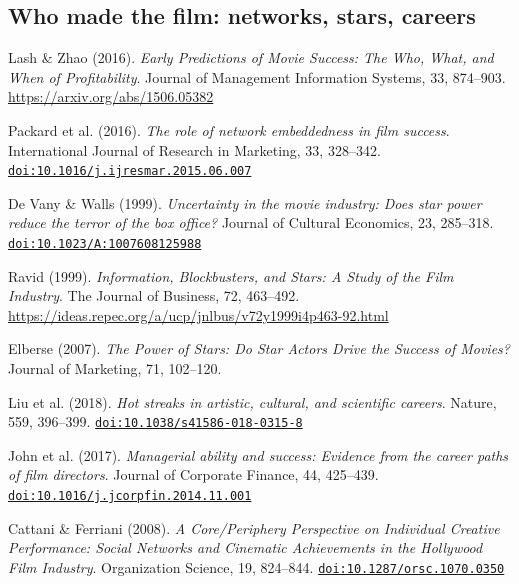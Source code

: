 \subsection{Who made the film: networks, stars, careers}
\begin{enumerate}[label={[\arabic*]},start=1,leftmargin=2.2em,itemsep=2pt]
\item Lash \& Zhao (2016). \textit{Early Predictions of Movie Success: The Who, What, and When of Profitability}. Journal of Management Information Systems, 33, 874--903. \url{https://arxiv.org/abs/1506.05382} 
\item Packard et al. (2016). \textit{The role of network embeddedness in film success}. International Journal of Research in Marketing, 33, 328--342. \href{https://doi.org/10.1016/j.ijresmar.2015.06.007}{\nolinkurl{doi:10.1016/j.ijresmar.2015.06.007}} 
\item De Vany \& Walls (1999). \textit{Uncertainty in the movie industry: Does star power reduce the terror of the box office?} Journal of Cultural Economics, 23, 285--318. \href{https://doi.org/10.1023/A:1007608125988}{\nolinkurl{doi:10.1023/A:1007608125988}} 
\item Ravid (1999). \textit{Information, Blockbusters, and Stars: A Study of the Film Industry}. The Journal of Business, 72, 463--492. \url{https://ideas.repec.org/a/ucp/jnlbus/v72y1999i4p463-92.html} 
\item Elberse (2007). \textit{The Power of Stars: Do Star Actors Drive the Success of Movies?} Journal of Marketing, 71, 102--120.  
\item Liu et al. (2018). \textit{Hot streaks in artistic, cultural, and scientific careers}. Nature, 559, 396--399. \href{https://doi.org/10.1038/s41586-018-0315-8}{\nolinkurl{doi:10.1038/s41586-018-0315-8}} 
\item John et al. (2017). \textit{Managerial ability and success: Evidence from the career paths of film directors}. Journal of Corporate Finance, 44, 425--439. \href{https://doi.org/10.1016/j.jcorpfin.2014.11.001}{\nolinkurl{doi:10.1016/j.jcorpfin.2014.11.001}} 
\item Cattani \& Ferriani (2008). \textit{A Core/Periphery Perspective on Individual Creative Performance: Social Networks and Cinematic Achievements in the {Hollywood} Film Industry}. Organization Science, 19, 824--844. \href{https://doi.org/10.1287/orsc.1070.0350}{\nolinkurl{doi:10.1287/orsc.1070.0350}} 

\end{enumerate}
